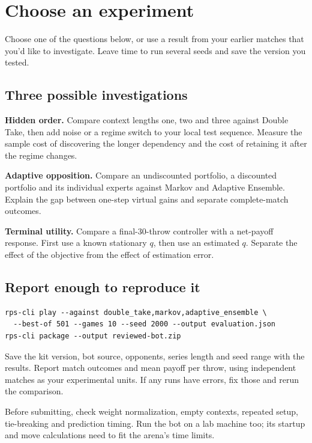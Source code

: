 \documentclass[11pt]{article}
\begin{document}
\section*{Choose an experiment}

\begin{context}
Choose one of the questions below, or use a result from your earlier matches that you'd like to investigate. Leave time to run several seeds and save the version you tested.

\end{context}

\subsection*{Three possible investigations}

\textbf{Hidden order.} Compare context lengths one, two and three against Double Take, then add noise or a regime switch to your local test sequence. Measure the sample cost of discovering the longer dependency and the cost of retaining it after the regime changes.


\textbf{Adaptive opposition.} Compare an undiscounted portfolio, a discounted portfolio and its individual experts against Markov and Adaptive Ensemble. Explain the gap between one-step virtual gains and separate complete-match outcomes.


\textbf{Terminal utility.} Compare a final-30-throw controller with a net-payoff response. First use a known stationary $q$, then use an estimated $q$. Separate the effect of the objective from the effect of estimation error.


\subsection*{Report enough to reproduce it}

\begin{lstlisting}[style=shell]
rps-cli play --against double_take,markov,adaptive_ensemble \
  --best-of 501 --games 10 --seed 2000 --output evaluation.json
rps-cli package --output reviewed-bot.zip
\end{lstlisting}

Save the kit version, bot source, opponents, series length and seed range with the results. Report match outcomes and mean payoff per throw, using independent matches as your experimental units. If any runs have errors, fix those and rerun the comparison.


Before submitting, check weight normalization, empty contexts, repeated setup, tie-breaking and prediction timing. Run the bot on a lab machine too; its startup and move calculations need to fit the arena's time limits.
\end{document}
